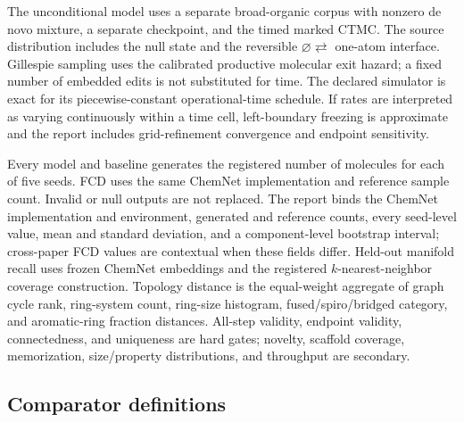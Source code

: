 The unconditional model uses a separate broad-organic corpus with nonzero de
novo mixture, a separate checkpoint, and the timed marked CTMC.  The source
distribution includes the null state and the reversible
$\varnothing\rightleftarrows$ one-atom interface.  Gillespie sampling uses the
calibrated productive molecular exit hazard; a fixed number of embedded edits
is not substituted for time. The declared simulator is exact for its
piecewise-constant operational-time schedule. If rates are interpreted as
varying continuously within a time cell, left-boundary freezing is approximate
and the report includes grid-refinement convergence and endpoint sensitivity.

Every model and baseline generates the registered number of molecules for
each of five seeds.  FCD uses the same ChemNet implementation and reference
sample count. Invalid or null outputs are not replaced. The report binds the
ChemNet implementation and environment, generated and reference counts, every
seed-level value, mean and standard deviation, and a component-level bootstrap
interval; cross-paper FCD values are contextual when these fields differ.
Held-out manifold recall uses frozen ChemNet embeddings and the registered
$k$-nearest-neighbor coverage construction. Topology distance is the
equal-weight aggregate of graph cycle rank, ring-system count, ring-size
histogram, fused/spiro/bridged category, and aromatic-ring fraction distances.
All-step validity, endpoint validity, connectedness, and uniqueness are hard
gates; novelty, scaffold coverage, memorization, size/property distributions,
and throughput are secondary.

\subsection{Comparator definitions}
\label{app:comparators}


